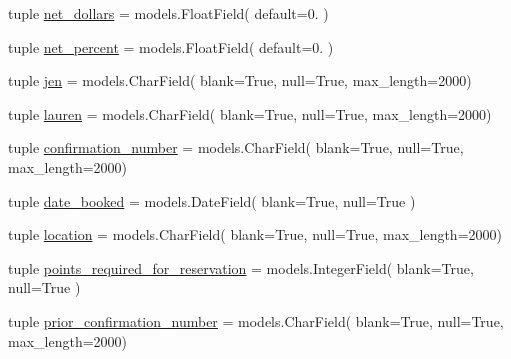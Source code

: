 \begin{DoxyCompactItemize}
\item 
tuple \hyperlink{namespaceguest__reservation__manager_1_1models_ae72debea279da55366fe8cb3d4a6bf2c}{net\-\_\-dollars} = models.\-Float\-Field( default=0. )
\item 
tuple \hyperlink{namespaceguest__reservation__manager_1_1models_a5c8cf779a5de03e48a3b1f7971b7c1a6}{net\-\_\-percent} = models.\-Float\-Field( default=0. )
\item 
tuple \hyperlink{namespaceguest__reservation__manager_1_1models_ad73007564278abcdf3cd20c3b86d647d}{jen} = models.\-Char\-Field( blank=True, null=True, max\-\_\-length=2000)
\item 
tuple \hyperlink{namespaceguest__reservation__manager_1_1models_acec791a4f68f7bf9ffb24b0c7a4aa3c6}{lauren} = models.\-Char\-Field( blank=True, null=True, max\-\_\-length=2000)
\item 
tuple \hyperlink{namespaceguest__reservation__manager_1_1models_ac10b02fe74f7251e88135c97ed860dfd}{confirmation\-\_\-number} = models.\-Char\-Field( blank=True, null=True, max\-\_\-length=2000)
\item 
tuple \hyperlink{namespaceguest__reservation__manager_1_1models_a22af95f3c472c6b3ca4ef3b1e4fdfaa8}{date\-\_\-booked} = models.\-Date\-Field( blank=True, null=True )
\item 
tuple \hyperlink{namespaceguest__reservation__manager_1_1models_aeae418e0c45c5e6ff43d38064f5766cc}{location} = models.\-Char\-Field( blank=True, null=True, max\-\_\-length=2000)
\item 
tuple \hyperlink{namespaceguest__reservation__manager_1_1models_a5a97c41c812544cee424bd27b7c8f78a}{points\-\_\-required\-\_\-for\-\_\-reservation} = models.\-Integer\-Field( blank=True, null=True )
\item 
tuple \hyperlink{namespaceguest__reservation__manager_1_1models_ad470044825931af57b6cee8ae98c2a02}{prior\-\_\-confirmation\-\_\-number} = models.\-Char\-Field( blank=True, null=True, max\-\_\-length=2000)
\end{DoxyCompactItemize}


